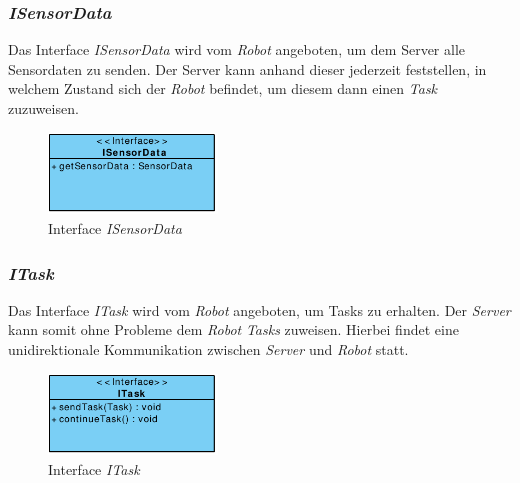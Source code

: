 	\subsubsection{\textit{ISensorData}}
	Das Interface \textit{ISensorData} wird vom \textit{Robot} angeboten, um dem Server alle Sensordaten zu senden. Der Server kann anhand dieser jederzeit feststellen, in welchem Zustand sich der \textit{Robot} befindet, um diesem dann einen \textit{Task} zuzuweisen.
	\begin{figure}[H]
	\centering
	\includegraphics[width=0.4\textwidth]{img/1-Entwurf-3-1_ISensorData}
	\caption{Interface \emph{ISensorData}}
	\label{ISensorData}
	\end{figure}

	\subsubsection{\textit{ITask}}
	Das Interface \textit{ITask} wird vom \textit{Robot} angeboten, um Tasks zu erhalten. Der \emph{Server} kann somit ohne Probleme dem \textit{Robot} \textit{Tasks} zuweisen. Hierbei findet eine unidirektionale Kommunikation zwischen \emph{Server} und \emph{Robot} statt.
	\begin{figure}[H]
	\centering
	\includegraphics[width=0.4\textwidth]{img/1-Entwurf-3-1_ITask}
	\caption{Interface \emph{ITask}}
	\label{ITask}
	\end{figure}
